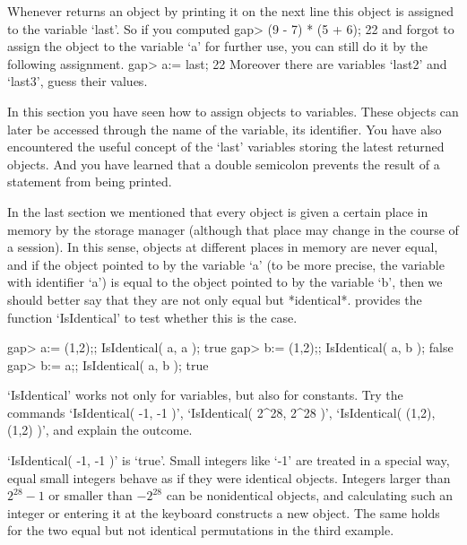 Whenever {\GAP} returns an object by printing it  on  the next  line this
object is assigned to the variable `last'.  So if you computed
\beginexample
    gap> (9 - 7) * (5 + 6);
    22 
\endexample
and forgot to assign the object to the  variable `a' for further use, you
can still do it by the following assignment.
\beginexample
    gap> a:= last;
    22 
\endexample
Moreover there are variables `last2' and `last3', guess their values.

In this section you  have seen how to  assign objects to variables. These
objects  can  later be accessed  through the  name  of the  variable, its
identifier. You  have also encountered the  useful concept of  the `last'
variables storing the latest returned  objects. And you have learned that
a double semicolon prevents the result of a statement from being printed.

\null

%
In the last section  we mentioned that every object   is given a  certain
place  in memory by the  {\GAP} storage manager  (although that place may
change in the course  of  a {\GAP}  session). In  this sense, objects  at
different places in memory are never equal, and if  the object pointed to
by the  variable  `a' (to be more  precise,  the variable with identifier
`a')  is  equal to the   object pointed to by  the  variable `b', then we
should better  say that they  are not only  equal but *identical*. {\GAP}
provides the function `IsIdentical' to test whether this is the case.

\beginexample
    gap> a:= (1,2);; IsIdentical( a, a );
    true
    gap> b:= (1,2);; IsIdentical( a, b );
    false
    gap> b:= a;; IsIdentical( a, b );
    true
\endexample

%
\exercise  `IsIdentical' works not   only   for variables, but  also  for
constants. Try the commands `IsIdentical( -1,  -1 )', `IsIdentical( 2^28,
2^28 )', `IsIdentical( (1,2), (1,2) )', and explain the outcome.

\answer `IsIdentical( -1,  -1 )' is  `true'. Small integers like `-1' are
treated in a  special way,  equal small  integers behave as  if they were
identical  objects. Integers  larger   than $2^{28}-1$  or  smaller  than
$-2^{28}$ can be nonidentical objects, and calculating such an integer or
entering it  at the keyboard constructs a  new object. The same holds for
the two equal but not identical permutations in the third example.

